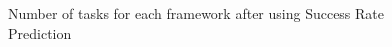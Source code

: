 \documentclass[12pt,oneside,openright,a4paper]{cpe-english-project}
\begin{document}
\begin{figure}[!h]\centering
    \setlength{\fboxrule}{0mm} %
    \setlength{\fboxsep}{0cm}
    \caption{Number of tasks for each framework after using Success Rate Prediction}\label{fig:task2}
\end{figure}
\end{document}
